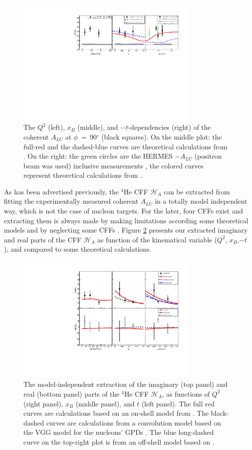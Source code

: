 \documentclass[nofootinbib,twocolumn,showpacs,prl,superscriptaddress,secnumarabic,amssymb,nobibnotes,aps,floatfix]{revtex4}
\begin{document}
\begin{figure}[tb]
\includegraphics[width=8.9cm]{figs/coherent-ALU_90.pdf}
\caption{The $Q^{2}$ (left), $x_{B}$ (middle), and $-t$-dependencies (right) of
   the coherent $A_{LU}$ at $\phi$~=~90$^{\circ}$ (black squares). On the 
   middle plot: the full-red and the dashed-blue curves are theoretical 
   calculations from \cite{simonetta_2}. On the right: the green circles are 
   the HERMES $-A_{LU}$ (positron beam was used) inclusive measurements 
   \cite{HERMES_BSA}, the colored curves represent theoretical calculations 
from \cite{simonetta_2}.}
\label{fig:alu90}
\end{figure}

As has been advertised previously, the $^4$He CFF $\mathcal{H}_A$ can be 
extracted from fitting the experimentally measured coherent $A_{LU}$ in a 
totally model independent way, which is not the case of nucleon targets. For 
the later, four CFFs exist and extracting them is always made by making 
limitations according some theoretical models and by neglecting some CFFs 
\cite{Jo:2015ema}. Figure \ref{fig:CFF_HA} presents our extracted imaginary and 
real parts of the CFF $\mathcal{H}_A$ as function of the kinematical variable 
($Q^{2}$, $x_B$,$-t$), and compared to some theoretical calculations.

\begin{figure}[tb]
\includegraphics[width=8.9cm]{figs/Coherent_CFF.pdf}
\caption{The model-independent extraction of the imaginary (top panel) and
real (bottom panel) parts of the $^4$He CFF $\mathcal{H}_A$, as functions of
$Q^{2}$ (right panel), $x_B$ (middle panel), and $t$ (left panel). The full red 
curves are calculations based on an on-shell model from
\cite{Vadim_priv}. The black-dashed curves are calculations from a convolution 
model based on the VGG model for the nucleons' GPDs \cite{Guidal_priv}. The 
blue long-dashed curve on the top-right plot is from
an off-shell model based on \cite{GonzalezHernandez:2012jv}.}
\label{fig:CFF_HA}
\end{figure}
\end{document}
